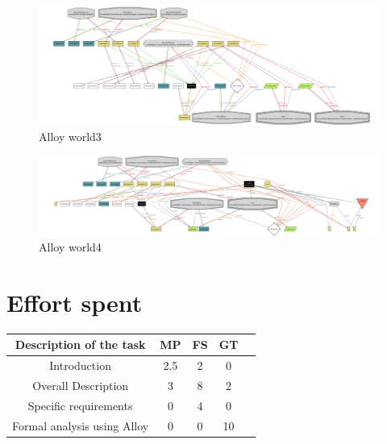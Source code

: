 \documentclass{article}
\begin{document}
\begin{figure}[H]
    \centering
    \includegraphics[angle=90,scale=0.18]{Images/Alloy-World3}
    \caption{Alloy world3}
\end{figure}
\begin{figure}[H]
    \centering
    \includegraphics[angle=90, scale=0.25]{Images/Alloy-World4}
    \caption{Alloy world4}
\end{figure}



\newpage
\section{Effort spent}
\begin{center}
    \begin{tabular}{|c|c|c|c|c|}
        \hline
        \textbf{Description of the task} & \textbf{MP} & \textbf{FS} &
        \textbf{GT} \\
        \hline
        Introduction                    & 2.5   & 2     & 0     \\
        Overall Description             & 3     & 8     & 2     \\
        Specific requirements           & 0     & 4     & 0     \\
        Formal analysis using Alloy     & 0     & 0     & 10    \\
        \hline
    \end{tabular}
\end{center}

    
\end{document}
